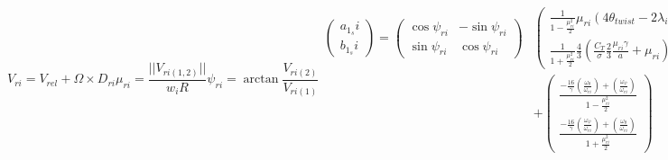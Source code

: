     \begin{subequations}
        \label{eq:observer:flapping}
        \begin{equation}
            V_{ri} = V_{rel} + \Omega \times D_{ri} %
        \end{equation}
        \begin{equation}
            \mu_{ri} = \frac{||V_{ri(1,2)}||}{w_{i}R}
        \end{equation}
        \begin{equation}
            \psi_{ri} = \arctan{\frac{V_{ri(2)}}{V_{ri(1)}}}
        \end{equation}
        \begin{equation}
            \label{eq:observer:flapping:ab}
            \begin{array}{rr}\left(
                \begin{array}{c}
                    a_{1_{s}}i \\
                    b_{1_{s}}i
                \end{array} \right)
                = \left(
                \begin{array}{cc}
                    \cos{\psi_{ri}} & -\sin{\psi_{ri}} \\
                    \sin{\psi_{ri}} & \cos{\psi_{ri}}
                \end{array}
                \right) & \left(
                    \begin{array}{c}
                        \frac{1}{1 - \frac{\mu_{ri}^{2}}{2}}\mu_{ri}\left( 4 \theta_{twist} - 2\lambda_{i}\right) \\
                        \frac{1}{1 + \frac{\mu_{ri}^{2}}{2}}\frac{4}{3}\left( \frac{C_{T}}{\sigma}\frac{2}{3}\frac{\mu_{ri}\gamma}{a} + \mu_{ri}\right)
                    \end{array}
                \right) \\
                & +
                \left(
                    \begin{array}{c}
                        \frac{-\frac{16}{\gamma}\left(\frac{\omega_{\theta}}{\omega_{ri}}\right) + \left(\frac{\omega_{\psi}}{\omega_{ri}}\right)}{1 - \frac{\mu_{ri}^{2}}{2}} \\
                        \frac{-\frac{16}{\gamma}\left(\frac{\omega_{\psi}}{\omega_{ri}}\right) + \left(\frac{\omega_{\theta}}{\omega_{ri}}\right)}{1 + \frac{\mu_{ri}^{2}}{2}}
                    \end{array}
                \right)
            \end{array}
        \end{equation}


\end{subequations}
